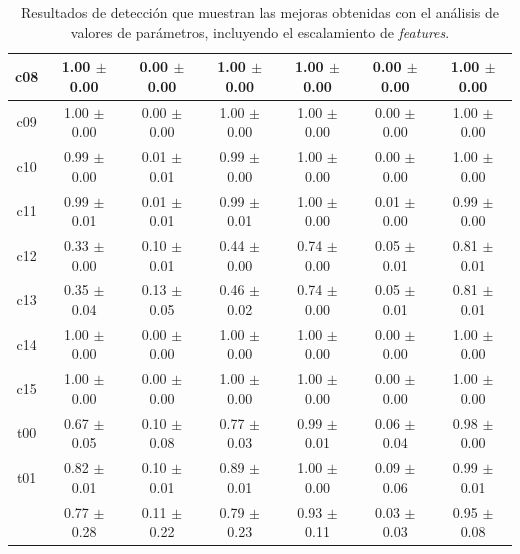 \begin{table}[hbt]
\begin{tabularx}{\linewidth}{|c|CCC|CCC|}
        c08 & \num{1.00} $\pm$ \num{0.00} & \num{0.00} $\pm$ \num{0.00} & \num{1.00} $\pm$ \num{0.00} & \num{1.00} $\pm$ \num{0.00} & \num{0.00} $\pm$ \num{0.00} & \num{1.00} $\pm$ \num{0.00} \\ \hline
        c09 & \num{1.00} $\pm$ \num{0.00} & \num{0.00} $\pm$ \num{0.00} & \num{1.00} $\pm$ \num{0.00} & \num{1.00} $\pm$ \num{0.00} & \num{0.00} $\pm$ \num{0.00} & \num{1.00} $\pm$ \num{0.00} \\ \hline
        c10 & \num{0.99} $\pm$ \num{0.00} & \num{0.01} $\pm$ \num{0.01} & \num{0.99} $\pm$ \num{0.00} & \num{1.00} $\pm$ \num{0.00} & \num{0.00} $\pm$ \num{0.00} & \num{1.00} $\pm$ \num{0.00} \\ \hline
        c11 & \num{0.99} $\pm$ \num{0.01} & \num{0.01} $\pm$ \num{0.01} & \num{0.99} $\pm$ \num{0.01} & \num{1.00} $\pm$ \num{0.00} & \num{0.01} $\pm$ \num{0.00} & \num{0.99} $\pm$ \num{0.00} \\ \hline
        c12 & \num{0.33} $\pm$ \num{0.00} & \num{0.10} $\pm$ \num{0.01} & \num{0.44} $\pm$ \num{0.00} & \num{0.74} $\pm$ \num{0.00} & \num{0.05} $\pm$ \num{0.01} & \num{0.81} $\pm$ \num{0.01} \\ \hline
        c13 & \num{0.35} $\pm$ \num{0.04} & \num{0.13} $\pm$ \num{0.05} & \num{0.46} $\pm$ \num{0.02} & \num{0.74} $\pm$ \num{0.00} & \num{0.05} $\pm$ \num{0.01} & \num{0.81} $\pm$ \num{0.01} \\ \hline
        c14 & \num{1.00} $\pm$ \num{0.00} & \num{0.00} $\pm$ \num{0.00} & \num{1.00} $\pm$ \num{0.00} & \num{1.00} $\pm$ \num{0.00} & \num{0.00} $\pm$ \num{0.00} & \num{1.00} $\pm$ \num{0.00} \\ \hline
        c15 & \num{1.00} $\pm$ \num{0.00} & \num{0.00} $\pm$ \num{0.00} & \num{1.00} $\pm$ \num{0.00} & \num{1.00} $\pm$ \num{0.00} & \num{0.00} $\pm$ \num{0.00} & \num{1.00} $\pm$ \num{0.00} \\ \hline
        t00 & \num{0.67} $\pm$ \num{0.05} & \num{0.10} $\pm$ \num{0.08} & \num{0.77} $\pm$ \num{0.03} & \num{0.99} $\pm$ \num{0.01} & \num{0.06} $\pm$ \num{0.04} & \num{0.98} $\pm$ \num{0.00} \\ \hline
        t01 & \num{0.82} $\pm$ \num{0.01} & \num{0.10} $\pm$ \num{0.01} & \num{0.89} $\pm$ \num{0.01} & \num{1.00} $\pm$ \num{0.00} & \num{0.09} $\pm$ \num{0.06} & \num{0.99} $\pm$ \num{0.01} \\
            & \num{0.77} $\pm$ \num{0.28} & \num{0.11} $\pm$ \num{0.22} & \num{0.79} $\pm$ \num{0.23} & \num{0.93} $\pm$ \num{0.11} & \num{0.03} $\pm$ \num{0.03} & \num{0.95} $\pm$ \num{0.08} \\ \hline
    \end{tabularx}

    \caption{Resultados de detección que muestran las mejoras obtenidas
        con el análisis de valores de parámetros, incluyendo el escalamiento
        de \textit{features}.}
    \label{tbl:res:results_features}
\end{table}

